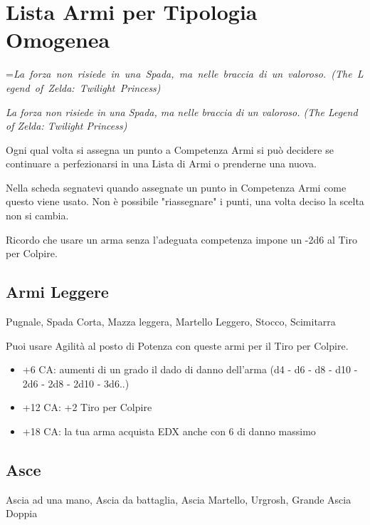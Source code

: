 \documentclass[a4paper,11pt,twoside,openany]{book}
\makeatletter
\newcommand{\mybox}[1]{%
	\setbox0=\hbox{#1}%
	\setlength{\@tempdima}{\dimexpr\wd0+13pt}%
	\begin{tcolorbox}[boxrule=0.5pt,arc=4pt, breakable,enhanced,
		left=6pt,right=6pt,top=6pt,bottom=6pt,boxsep=0pt,width=\@tempdima]
		#1
	\end{tcolorbox}
}
\makeatother
\begin{document}
\pagebreak

\section{Lista Armi per Tipologia Omogenea}

\label{lista-armi-per-tipologia-omogenea}
\mybox{\textit{La forza non risiede in una Spada, ma nelle braccia di un valoroso. (The Legend of Zelda: Twilight Princess)
}}\medskip

Ogni qual volta si assegna un punto a Competenza Armi si può decidere se continuare a perfezionarsi in una Lista di Armi o prenderne una nuova.

Nella scheda segnatevi quando assegnate un punto in Competenza Armi come questo viene usato. Non è possibile "riassegnare" i punti, una volta deciso la scelta non si cambia.

Ricordo che usare un arma senza l'adeguata competenza impone un -2d6 al Tiro per Colpire.

\subsection{Armi Leggere}Pugnale, Spada Corta, Mazza leggera, Martello Leggero, Stocco, Scimitarra

Puoi usare Agilità al posto di Potenza con queste armi per il Tiro
per Colpire.

\begin{itemize}
	\item +6 CA: aumenti di un grado il dado di danno dell'arma (d4 - d6 - d8 - d10 - 2d6 - 2d8 - 2d10 - 3d6..)
	
	\item +12 CA: +2 Tiro per Colpire
	
	\item +18 CA: la tua arma acquista EDX anche con 6 di danno massimo 
\end{itemize}

\subsection{Asce} Ascia ad una mano, Ascia da battaglia, Ascia Martello, Urgrosh, Grande Ascia Doppia
\end{document}
